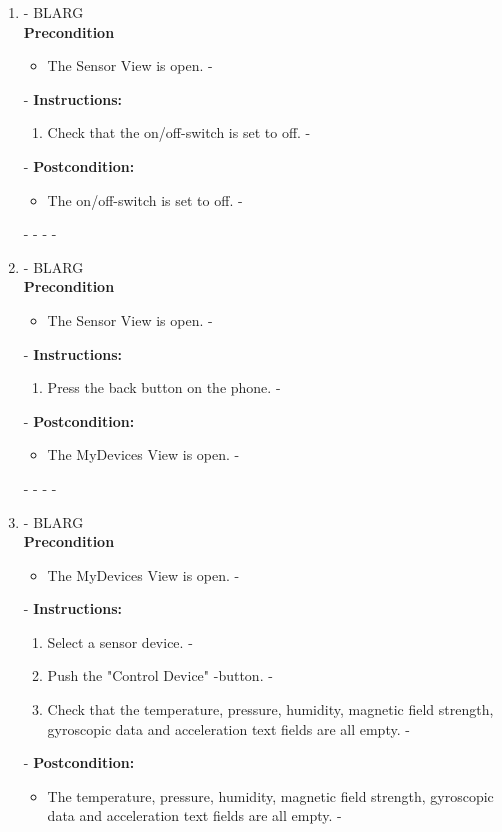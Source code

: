 \documentclass[a4paper]{article}
\newlength{\testlabellength}
\newenvironment{testlist}{\begin{enumerate}[label=\bfseries Instruction \thesubsection.\arabic* , labelindent=0pt, labelwidth=\testlabellength , leftmargin=2cm]}{\end{enumerate}}
\newenvironment{precondition}{
{\color{white}BLARG}\\ 
\textbf{Precondition}
\begin{itemize}[labelindent=0cm, labelwidth=2cm , leftmargin=1cm]
}
{\end{itemize}}
\newenvironment{instruction}{
\textbf{Instructions:}
\begin{enumerate}[label=\bfseries  \arabic*., labelindent=0cm, labelwidth=2cm , leftmargin=1cm]
}
{\end{enumerate}}
\newenvironment{postcondition}{
\textbf{Postcondition:}
\begin{itemize}[labelindent=0cm, labelwidth=2cm , leftmargin=1cm]
}
{\end{itemize}}
\begin{document}
\begin{appendices}
\begin{testlist}
-	\item
-		\begin{precondition}
-			\item The Sensor View is open.
-		\end{precondition}
-		\begin{instruction}
-			\item Check that the on/off-switch is set to off.
-		\end{instruction}
-		\begin{postcondition}
-			\item The on/off-switch is set to off.
-		\end{postcondition}
-
-%
-
-	\item
-		\begin{precondition}
-			\item The Sensor View is open.
-		\end{precondition}
-		\begin{instruction}
-			\item Press the back button on the phone.
-		\end{instruction}
-		\begin{postcondition}
-			\item The MyDevices View is open.
-		\end{postcondition}
-
-%
-
-	\item
-		\begin{precondition}
-			\item The MyDevices View is open.
-		\end{precondition}
-		\begin{instruction}			
-			\item Select a sensor device.
-			\item Push the "Control Device" -button.
-			\item Check that the temperature, pressure, humidity, magnetic field strength, gyroscopic data and acceleration text fields are all empty.
-		\end{instruction}
-		\begin{postcondition}
-			\item The temperature, pressure, humidity, magnetic field strength, gyroscopic data and acceleration text fields are all empty.
-		\end{postcondition}

\end{testlist}
\end{appendices}
\end{document}
